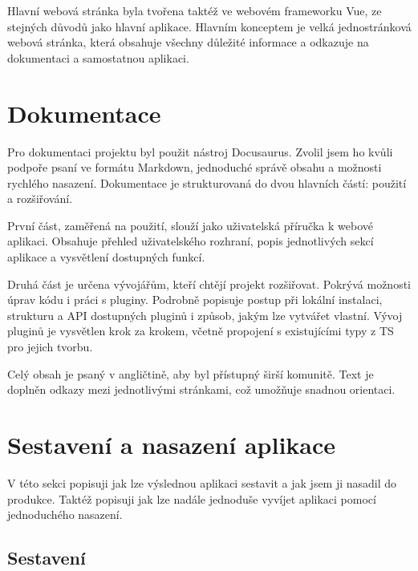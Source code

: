Hlavní webová stránka byla tvořena taktéž ve webovém frameworku Vue, ze stejných důvodů jako hlavní aplikace.
Hlavním konceptem je velká jednostránková webová stránka, která obsahuje všechny důležité informace a odkazuje na dokumentaci a samostatnou aplikaci.

\section{Dokumentace}

Pro dokumentaci projektu byl použit nástroj Docusaurus. 
Zvolil jsem ho kvůli podpoře psaní ve formátu Markdown, jednoduché správě obsahu a možnosti rychlého nasazení. 
Dokumentace je strukturovaná do dvou hlavních částí: použití a rozšiřování.

První část, zaměřená na použití, slouží jako uživatelská příručka k webové aplikaci. 
Obsahuje přehled uživatelského rozhraní, popis jednotlivých sekcí aplikace a vysvětlení dostupných funkcí. 

Druhá část je určena vývojářům, kteří chtějí projekt rozšiřovat. 
Pokrývá možnosti úprav kódu i práci s pluginy. 
Podrobně popisuje postup při lokální instalaci, strukturu a API dostupných pluginů i způsob, jakým lze vytvářet vlastní. 
Vývoj pluginů je vysvětlen krok za krokem, včetně propojení s existujícími typy z TS pro jejich tvorbu.

Celý obsah je psaný v angličtině, aby byl přístupný širší komunitě. 
Text je doplněn odkazy mezi jednotlivými stránkami, což umožňuje snadnou orientaci.


\section{Sestavení a nasazení aplikace}\label{text:realizace/nasazeni}

V této sekci popisuji jak lze výslednou aplikaci sestavit a jak jsem ji nasadil do produkce.
Taktéž popisuji jak lze nadále jednoduše vyvíjet aplikaci pomocí jednoduchého nasazení. 

\subsection{Sestavení}

